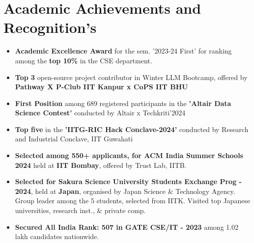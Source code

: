 \documentclass[10.8pt, a4paper]{extarticle}
\newcommand{\shorterSection}[1]{\vspace{-10pt}\section{#1}}
\begin{document}
\shorterSection{Academic Achievements and Recognition's}
\begin{itemize}

 \item \textbf{Academic Excellence Award} for the sem. '2023-24 First' for ranking among the \textbf{top 10\%} in the CSE department.\href{https://www.iitk.ac.in/sspc/data/2nd-list-of-Academic-Excellence-Awards-2023-21-03-24.pdf}{\faLink{}} \href{https://drive.google.com/file/d/1jnb98lF2TscnxkIrKWC_X26nIbIIifDF/view?usp=sharing}{\faLink{}} \\[-0.6cm]
 
 
  \item {\textbf{Top 3 }}open-source project contributor in Winter LLM Bootcamp, offered by \textbf{Pathway X P-Club IIT Kanpur x CoPS IIT BHU} \href{https://drive.google.com/file/d/1IfNvpMIZuecpOPDMtjZ7ORE86eddqhK-/view?usp=sharing}{\faEnvelope{}} \href{https://t.certifier.io/CL0/https:%2F%2Fapi.credsverse.com%2Fv1%2Fusers%2Finvite%2Fceed2b44-26ae-4085-a1c6-291760efed0a/1/0102018ede88dc5e-89a09bd7-6cea-4807-a2c9-3dff747834d9-000000/_U00joiSf7_qp3anDSJNAiO00y7Hxm7ONFmpv6zOP2g=348}{\faLink{}}   \\[-0.6cm]

  \item \textbf{First Position} among 689 registered participants in the \textbf{'Altair Data Science Contest'} conducted by Altair x Techkriti'2024 \href{https://drive.google.com/file/d/1D9f-N0dg1hDBg25C0PcwicyXPSVoKH6y/view?usp=sharing}{\faLink{}} \href{https://www.linkedin.com/feed/update/urn:li:activity:7209120328172589056/}{\faLink{}} 
\item \textbf{Top five} in the \textbf{'IITG-RIC Hack Conclave-2024'} conducted by Research and Industrial Conclave, IIT Guwahati \href{https://drive.google.com/file/d/1Ck94WUX1KaKJrRHAmt-HNdJeLTmaMKdR/view?usp=sharing}{\faEnvelope{}}

    \item {\textbf{Selected among 550+ applicants, for ACM India Summer Schools 2024}} held at {\textbf{IIT Bombay}}, offered by Trust Lab, IITB. \href{https://drive.google.com/file/d/1mHDlgpKEQpYF-BHE-QLPfYljADycJgEZ/view?usp=sharing}{\faLink{}}
    \href{https://trustlab.iitb.ac.in/trust-matters-2024-jun-summer-school-on-cryptography}{\faLink{}}


   \item {\textbf{Selected for Sakura Science University Students Exchange Prog - 2024}}, held at {\textbf{Japan}}, organised by Japan Science \& Technology Agency. Group leader among the 5 students, selected from IITK. Visited top Japanese universities, research inst., \& private comp.   \href{https://drive.google.com/file/d/1cprXZQaC9tLiOLi9QPF0u9wuk8HzhmZm/view?usp=sharing}{\faLink{}}
   \href{https://www.iitk.ac.in/oir/data/list-of-students-sakura-14-06-24.pdf}{\faLink{}}

   \item \textbf{ Secured All India Rank: 507 in GATE CSE/IT - 2023} among 1.02 lakh candidates nationwide. \href{https://drive.google.com/file/d/1IkVH0v_xUTgL83VHjq7N5oFpSjw99Zma/view?usp=drive_link}{}


\end{itemize}
\medskip
\end{document}
